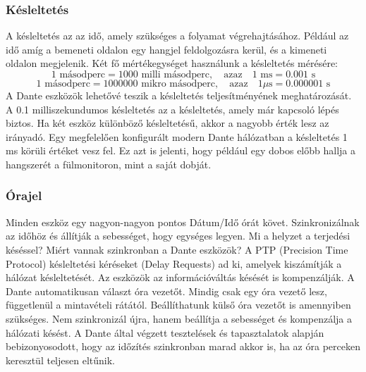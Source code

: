 \subsubsection{Késleltetés}
A késleltetés az az idő, amely szükséges a folyamat végrehajtásához. Például
az idő amíg a bemeneti oldalon egy hangjel feldolgozásra kerül, és a kimeneti
oldalon megjelenik. 
Két fő mértékegységet használunk a késleltetés mérésére:
\begin{equation}
	\label{eq:milliseconds}
	1 \text{ másodperc} = 1000 \text{ milli másodperc}, \quad \text{azaz} \quad 1 \text{ ms} = 0.001 \text{ s}
\end{equation}
\begin{equation}
	\label{eq:microseconds}
	1 \text{ másodperc} = 1000000 \text{ mikro másodperc}, \quad \text{azaz} \quad 1 \mu\text{s} = 0.000001 \text{ s}
\end{equation}
A Dante eszközök lehetővé teszik a késleltetés teljesítményének meghatározását. 
A 0.1 milliszekundumos késleltetés az a késleltetés, amely már kapcsoló lépés biztos.
Ha két eszköz különböző késleltetésű, akkor a nagyobb érték lesz az irányadó.
Egy megfelelően konfigurált modern Dante hálózatban a késleltetés 1 ms körüli értéket vesz fel.
Ez azt is jelenti, hogy például egy dobos előbb hallja a hangszerét a fülmonitoron, mint a saját dobját.

\subsubsection{Órajel}

Minden eszköz egy nagyon-nagyon pontos Dátum/Idő órát követ.
Szinkronizálnak az időhöz és állítják a sebességet, hogy egységes legyen.
Mi a helyzet a terjedési késéssel? Miért vannak szinkronban a Dante eszközök?
A PTP (Precision Time Protocol) késleltetési kéréseket (Delay Requests)
ad ki, amelyek kiszámítják a hálózat késleltetését. 
Az eszközök az információváltás késését is kompenzálják.
A Dante automatikusan választ óra vezetőt.
Mindig csak egy óra vezető lesz, függetlenül a mintavételi rátától.
Beállíthatunk külső óra vezetőt is amennyiben szükséges.
Nem szinkronizál újra, hanem beállítja a sebességet és kompenzálja a hálózati késést.
A Dante által végzett tesztelések és tapasztalatok alapján
bebizonyosodott, hogy az időzítés szinkronban marad akkor is,
ha az óra perceken keresztül teljesen eltűnik.

